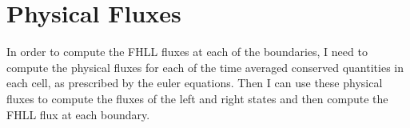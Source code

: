 \section{Physical Fluxes}
In order to compute the FHLL fluxes at each of the boundaries, I need to compute the physical fluxes for each of the time averaged conserved quantities in each cell, as prescribed by the euler equations. Then I can use these physical fluxes to compute the fluxes of the left and right states and then compute the FHLL flux at each boundary.
